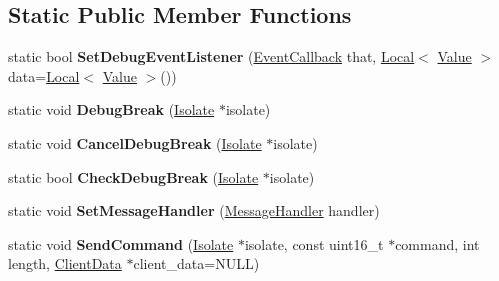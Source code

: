 \subsection*{Static Public Member Functions}
\begin{DoxyCompactItemize}
\item 
\hypertarget{classv8_1_1Debug_ac2d24e9b52877ec40236bd0ceea85e8b}{}static bool {\bfseries Set\+Debug\+Event\+Listener} (\hyperlink{classv8_1_1Debug_ab53894746a21222796062f0e81ea28d8}{Event\+Callback} that, \hyperlink{classv8_1_1Local}{Local}$<$ \hyperlink{classv8_1_1Value}{Value} $>$ data=\hyperlink{classv8_1_1Local}{Local}$<$ \hyperlink{classv8_1_1Value}{Value} $>$())\label{classv8_1_1Debug_ac2d24e9b52877ec40236bd0ceea85e8b}

\item 
\hypertarget{classv8_1_1Debug_a0c730ea558b1fc86cb728980c91a4c7c}{}static void {\bfseries Debug\+Break} (\hyperlink{classv8_1_1Isolate}{Isolate} $\ast$isolate)\label{classv8_1_1Debug_a0c730ea558b1fc86cb728980c91a4c7c}

\item 
\hypertarget{classv8_1_1Debug_a976a373dc06c146cdbe8d6f2fd7f57b5}{}static void {\bfseries Cancel\+Debug\+Break} (\hyperlink{classv8_1_1Isolate}{Isolate} $\ast$isolate)\label{classv8_1_1Debug_a976a373dc06c146cdbe8d6f2fd7f57b5}

\item 
\hypertarget{classv8_1_1Debug_aa564431664efa61d6d72c9cbd91b4ea2}{}static bool {\bfseries Check\+Debug\+Break} (\hyperlink{classv8_1_1Isolate}{Isolate} $\ast$isolate)\label{classv8_1_1Debug_aa564431664efa61d6d72c9cbd91b4ea2}

\item 
\hypertarget{classv8_1_1Debug_ab26a90abc5c21c752f6923a1986f0bb7}{}static void {\bfseries Set\+Message\+Handler} (\hyperlink{classv8_1_1Debug_a526826b857bd3e3efa184e12bcebc694}{Message\+Handler} handler)\label{classv8_1_1Debug_ab26a90abc5c21c752f6923a1986f0bb7}

\item 
\hypertarget{classv8_1_1Debug_aba2426f25ee7cd31659426287777bb00}{}static void {\bfseries Send\+Command} (\hyperlink{classv8_1_1Isolate}{Isolate} $\ast$isolate, const uint16\+\_\+t $\ast$command, int length, \hyperlink{classv8_1_1Debug_1_1ClientData}{Client\+Data} $\ast$client\+\_\+data=N\+U\+L\+L)\label{classv8_1_1Debug_aba2426f25ee7cd31659426287777bb00}


\end{DoxyCompactItemize}
